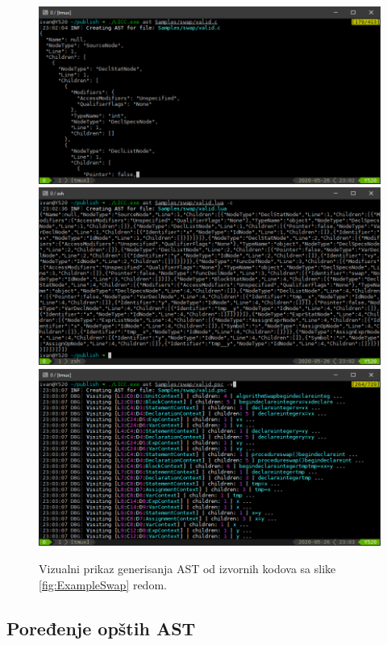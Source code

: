 \begin{figure}[h!]
\centering
\includegraphics[scale=0.6]{images/eval/ast_c.png}
\includegraphics[scale=0.6]{images/eval/ast_lua.png}
\includegraphics[scale=0.6]{images/eval/ast_psc.png}
\caption{Vizualni prikaz generisanja AST od izvornih kodova sa slike \ref{fig:ExampleSwap} redom.}
\label{fig:ExampleSwapAST}
\end{figure}


\subsection{Poređenje opštih AST}
\label{subsec:ImplementationExampleComparer}

